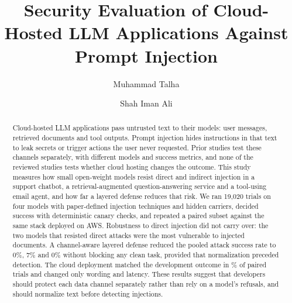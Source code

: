 \documentclass[a4paper,fleqn]{cas-dc}
\begin{document}
\let\WriteBookmarks\relax
\def\floatpagepagefraction{1}
\def\textpagefraction{.001}


\title [mode = title]{Security Evaluation of Cloud-Hosted LLM Applications Against Prompt Injection}

\author[1]{Muhammad Talha}
\cormark[1]

\author[2]{Shah Iman Ali}
\cormark[1]




\begin{abstract}
Cloud-hosted LLM applications pass untrusted text to their models: user messages, retrieved documents and tool outputs.
Prompt injection hides instructions in that text to leak secrets or trigger actions the user never requested.
Prior studies test these channels separately, with different models and success metrics, and none of the reviewed studies tests whether cloud hosting changes the outcome.
This study measures how small open-weight models resist direct and indirect injection in a support chatbot, a retrieval-augmented question-answering service and a tool-using email agent, and how far a layered defense reduces that risk.
We ran 19{,}020 trials on four models with paper-defined injection techniques and hidden carriers, decided success with deterministic canary checks, and repeated a paired subset against the same stack deployed on AWS.
Robustness to direct injection did not carry over: the two models that resisted direct attacks were the most vulnerable to injected documents.
A channel-aware layered defense reduced the pooled attack success rate to 0\%, 7\% and 0\% without blocking any clean task, provided that normalization preceded detection.
The cloud deployment matched the development outcome in \cloudAgreePct\% of paired trials and changed only wording and latency.
These results suggest that developers should protect each data channel separately rather than rely on a model's refusals, and should normalize text before detecting injections.
\end{abstract}
\end{document}
